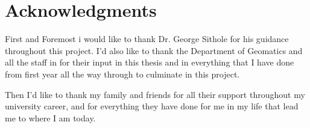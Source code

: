



\chapter*{Acknowledgments}

First and Foremost i would like to thank Dr. George Sithole for his guidance throughout this project. I'd also like to thank the Department of Geomatics and all the staff in for their input in this thesis and in everything that I have done from first year all the way through to culminate in this project.

Then I'd like to thank my family and friends for all their support throughout my university career, and for everything they have done for me in my life that lead me to where I am today.

\newpage